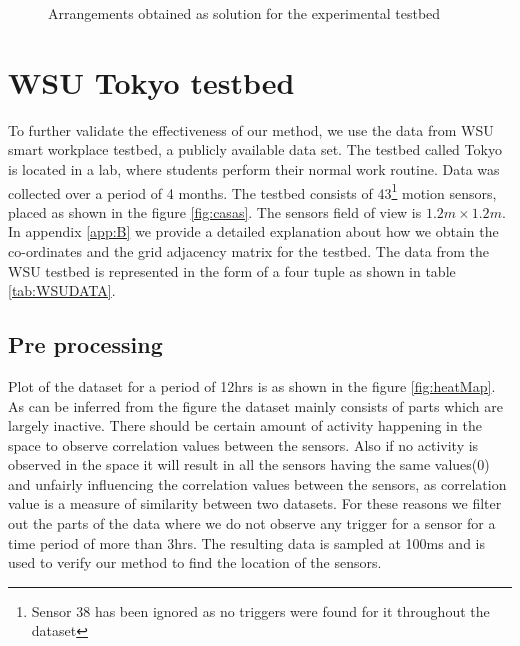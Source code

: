 \begin{figure}[!ht]
\caption{Arrangements obtained as solution for the experimental testbed}
\label{fig:arrangement4x2}
\centering
\end{figure}


\section{WSU Tokyo testbed}
To further validate the effectiveness of our method, we use the data from WSU smart workplace testbed\cite{cook2010detection}, a publicly available data set. The testbed called Tokyo is located in a lab,  where students perform their normal work routine. Data was collected over a period of 4 months. 
The testbed consists of 43\footnote{Sensor 38 has been ignored as no triggers were found for it throughout the dataset} motion sensors, placed as shown in the figure \ref{fig:casas}. The sensors field of view is $1.2m \times 1.2m$. In appendix \ref{app:B} we provide a detailed explanation about how we obtain the co-ordinates and the grid adjacency matrix for the testbed. The data from the WSU testbed is represented in the form of a four tuple as shown in table \ref{tab:WSUDATA}. 
\subsection{Pre processing}
Plot of the dataset for a period of 12hrs is as shown in the figure \ref{fig:heatMap}. As can be inferred from the figure the dataset mainly consists of parts which are largely inactive. There should be certain amount of activity happening in the space to observe correlation values between the sensors.  Also if  no activity is observed in the space it will result in all the sensors having the same values(0) and unfairly influencing the correlation values between the sensors, as correlation value is a measure of similarity between two datasets. For these reasons we filter out the parts of the data where we do not observe any trigger for a sensor for a time period of more than 3hrs. The resulting data is sampled at 100ms and is used to verify our method to find the location of the sensors.



